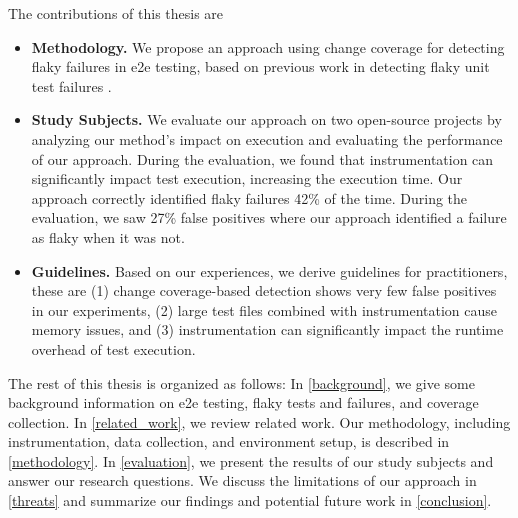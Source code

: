 The contributions of this thesis are
\begin{itemize}
	\item \textbf{Methodology.} We propose an approach using change coverage for detecting flaky failures in \ac{e2e} testing, based on previous work in detecting flaky unit test failures \autocite{bell_deflaker_2018}.
	\item \textbf{Study Subjects.} We evaluate our approach on two open-source projects by analyzing our method's impact on execution and evaluating the performance of our approach.
	      During the evaluation, we found that instrumentation can significantly impact test execution, increasing the execution time.
	      Our approach correctly identified flaky failures 42\% of the time.
	      During the evaluation, we saw 27\% false positives where our approach identified a failure as flaky when it was not.
	\item \textbf{Guidelines.} Based on our experiences, we derive guidelines for practitioners, these are
	      (1) change coverage-based detection shows very few false positives in our experiments,
	      (2) large test files combined with instrumentation cause memory issues, and
	      (3) instrumentation can significantly impact the runtime overhead of test execution.
\end{itemize}

The rest of this thesis is organized as follows:
In \cref{background}, we give some background information on \ac{e2e} testing, flaky tests and failures, and coverage collection.
In \cref{related_work}, we review related work.
Our methodology, including instrumentation, data collection, and environment setup, is described in \cref{methodology}.
In \cref{evaluation}, we present the results of our study subjects and answer our research questions.
We discuss the limitations of our approach in \cref{threats} and summarize our findings and potential future work in \cref{conclusion}.


